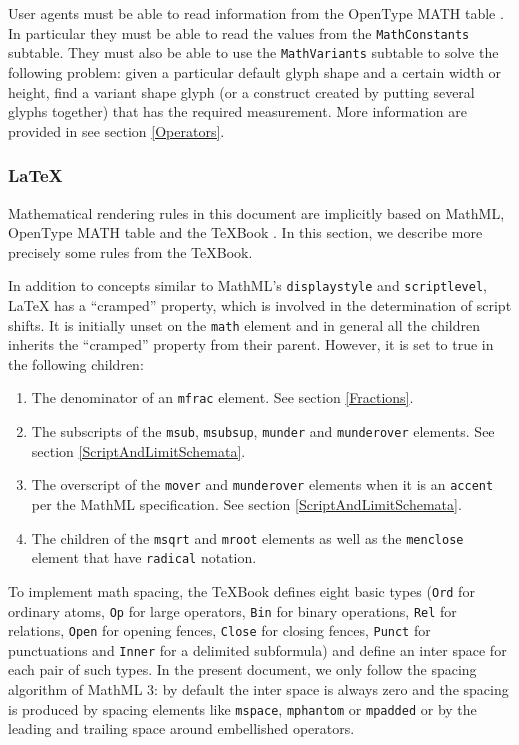 User agents must be able to read information from the
OpenType MATH table \cite{OpenFontFormat3}.
In particular they must be able to read the values from the
{\tt MathConstants} subtable.
They must also be able to use the {\tt MathVariants} subtable
to solve the following problem: given a particular default glyph shape and a
certain width or height, find a variant shape glyph (or a construct created by
putting several glyphs together) that has the required measurement.
More information are provided in see section \ref{Operators}.

\subsubsection{LaTeX}\label{LaTeX}

Mathematical rendering rules in this document are implicitly based on
MathML, OpenType MATH table and the TeXBook
\cite{MathML3} \cite{OpenFontFormat3} \cite{TeXBook}. In this section, we
describe more precisely some rules from the TeXBook.

In addition to concepts similar to MathML's {\tt displaystyle} and
{\tt scriptlevel}, LaTeX has
a ``cramped'' property, which is involved in the determination of script shifts.
It is initially unset on the {\tt math} element and in general
all the children inherits the ``cramped'' property from their parent.
However, it is set to true in the following children:

\begin{enumerate}
\item The denominator of an {\tt mfrac} element. See section \ref{Fractions}.
\item The subscripts of the {\tt msub}, {\tt msubsup},
  {\tt munder} and {\tt munderover} elements.
  See section \ref{ScriptAndLimitSchemata}.
\item The overscript of the
  {\tt mover} and {\tt munderover} elements when it is an {\tt accent} per
  the MathML specification. See section \ref{ScriptAndLimitSchemata}.
\item The children of the {\tt msqrt} and {\tt mroot}
  elements as well as the {\tt menclose} element that have {\tt radical}
  notation.
\end{enumerate}

To implement math spacing, the TeXBook defines eight basic types
({\tt Ord} for ordinary atoms, {\tt Op} for large operators,
{\tt Bin} for binary operations, {\tt Rel} for relations,
{\tt Open} for opening fences, {\tt Close} for closing fences,
{\tt Punct} for punctuations and {\tt Inner} for a delimited subformula) and
define an inter space for each pair of such types. In the present document,
we only follow the spacing algorithm of MathML 3: by default the inter space
is always zero and the spacing is produced by spacing elements like
{\tt mspace}, {\tt mphantom} or {\tt mpadded} or by the leading and trailing
space around embellished operators.

